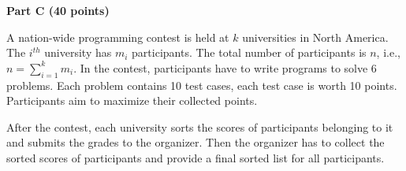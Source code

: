 \documentclass{article}
\begin{document}
\begin{center}
{\bf Part C (40 points)}
\end{center}


 A nation-wide programming contest is held
at $k$ universities in North America. The $i^{th}$ university has
$m_{i}$ participants. The total number of participants is $n$, i.e.,
$n = \sum_{i=1}^{k}m_{i}$. In the contest, participants have to write
programs to solve 6 problems. Each problem contains 10 test cases,
each test case is worth 10 points. Participants aim to maximize their
collected points.  

After the contest, each university sorts the scores of participants
belonging to it and submits the grades to the organizer.  Then the
organizer has to collect the sorted scores of participants and provide
a final sorted list for all participants.
\end{document}
